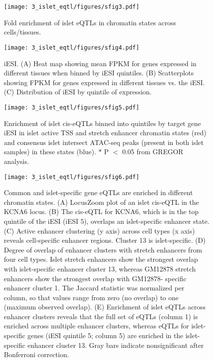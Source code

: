 \begin{figure}
    \centering
    \texttt{[image: 3\_islet\_eqtl/figures/sfig3.pdf]}
    \caption{Fold enrichment of islet eQTLs in chromatin states across cells/tissues.}
    \label{fig:c2_sf3}
\end{figure}

\begin{figure}
    \centering
    \texttt{[image: 3\_islet\_eqtl/figures/sfig4.pdf]}
    \caption{iESI. (A) Heat map showing mean FPKM for genes expressed in different tissues when binned by iESI quintiles. (B) Scatterplots showing FPKM for genes expressed in different tissues vs. the iESI. (C) Distribution of iESI by quintile of expression.}
    \label{fig:c2_sf4}
\end{figure}

\begin{figure}
    \centering
    \texttt{[image: 3\_islet\_eqtl/figures/sfig5.pdf]}
    \caption{Enrichment of islet cis-eQTLs binned into quintiles by target gene iESI in islet active TSS and stretch enhancer chromatin states (red) and consensus islet intersect ATAC-seq peaks (present in both islet samples) in these states (blue). $\ast$ P $<$ 0.05 from GREGOR analysis.}
    \label{fig:c2_sf5}
\end{figure}

\begin{figure}
    \centering
    \texttt{[image: 3\_islet\_eqtl/figures/sfig6.pdf]}
    \caption{Common and islet-specific gene eQTLs are enriched in different chromatin states. (A) LocusZoom plot of an islet cis-eQTL in the KCNA6 locus. (B) The cis-eQTL for KCNA6, which is in the top quintile of the iESI (iESI 5), overlaps an islet-specific enhancer state. (C) Active enhancer clustering (y axis) across cell types (x axis) reveals cell-specific enhancer regions. Cluster 13 is islet-specific. (D) Degree of overlap of enhancer clusters with stretch enhancers from four cell types. Islet stretch enhancers show the strongest overlap with islet-specific enhancer cluster 13, whereas GM12878 stretch enhancers show the strongest overlap with GM12878- specific enhancer cluster 1. The Jaccard statistic was normalized per column, so that values range from zero (no overlap) to one (maximum observed overlap). (E) Enrichment of islet eQTLs across enhancer clusters reveals that the full set of eQTLs (column 1) is enriched across multiple enhancer clusters, whereas eQTLs for islet-specific genes (iESI quintile 5; column 5) are enriched in the islet-specific enhancer cluster 13. Gray bars indicate nonsignificant after Bonferroni correction.}
    \label{fig:c2_sf6}
\end{figure}


